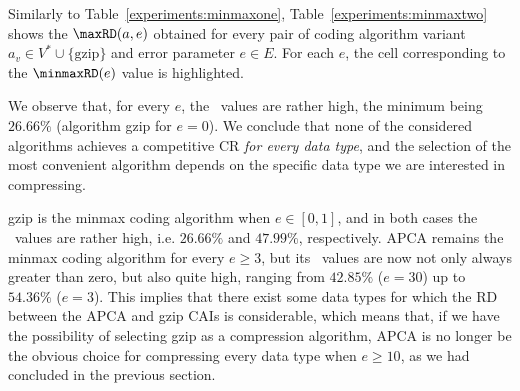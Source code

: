 \clearpage





Similarly to Table~\ref{experiments:minmaxone}, Table~\ref{experiments:minmaxtwo} shows the $\text{\maxRD}(a, e)$ obtained for every pair of coding algorithm variant $a_v \in V^* \cup \{\text{gzip}\}$ and error parameter $e \in E$. For each $e$, the cell corresponding to the $\text{\minmaxRD}(e)$ value is highlighted.


We observe that, for every $e$, the \minmaxRD\ values are rather high, the minimum being $26.66\%$ (algorithm gzip for $e=0$). We conclude that none of the considered algorithms achieves a competitive CR \textit{for every data type}, and the selection of the most convenient algorithm depends on the specific data type we are interested in compressing.


gzip is the minmax coding algorithm when $e \in [0, 1]$, and in both cases the \minmaxRD\ values are rather high, i.e. $26.66\%$ and $47.99\%$, respectively. APCA remains the minmax coding algorithm for every $e \geq 3$, but its \minmaxRD\ values are now not only always greater than zero, but also quite high, ranging from $42.85\%$ ($e=30$) up to $54.36\%$ ($e=3$). This implies that there exist some data types for which the RD between the APCA and gzip CAIs is considerable, which means that, if we have the possibility of selecting gzip as a compression algorithm, APCA is no longer be the obvious choice for compressing every data type when $e \geq 10$, as we had concluded in the previous section. 


\clearpage




